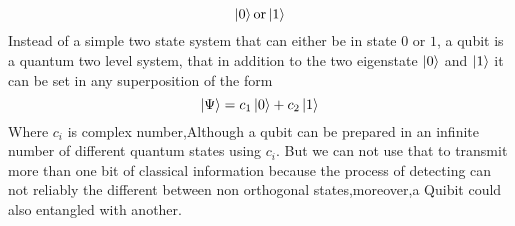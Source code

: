 \begin{equation}
\ket{0}\text{or}\ket{1}
\end{equation}
Instead of a simple two state system that can either be in state $0$ or $1$, a qubit is a quantum two level system, that in addition to the two eigenstate $\ket{0}$ and $\ket{1}$ it can be set in any superposition of the form
$$\ket{\Psi}=c_1\ket{0}+c_2\ket{1}$$
Where $c_i$ is complex number,Although a qubit can be prepared in an infinite number of different quantum states using $c_i$. But we can not use  that to transmit more than one bit of classical information because the process of detecting can not reliably the different between non orthogonal states,moreover,a Quibit could also entangled with another.
